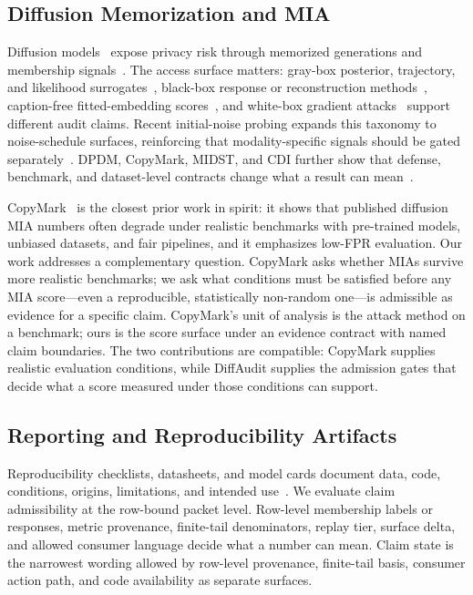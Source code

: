 \documentclass[10pt,conference]{IEEEtran}
\begin{document}
\subsection{Diffusion Memorization and MIA}

Diffusion models~\cite{ho2020ddpm,rombach2022ldm} expose privacy risk through
memorized generations and membership signals~\cite{carlini2023extracting,somepalli2023replication}.
The access surface matters: gray-box posterior, trajectory, and likelihood
surrogates~\cite{duan2023secmi,kong2024pia,zha2024clid,tracingroots2025},
black-box response or reconstruction methods~\cite{rediffuse2025,reconstruction2025blackbox},
caption-free fitted-embedding scores~\cite{jeon2026mofit}, and white-box
gradient attacks~\cite{gsa2025whitebox} support different audit claims. Recent
initial-noise probing expands this taxonomy to noise-schedule surfaces,
reinforcing that modality-specific signals should be gated separately~\cite{lian2026noiseprobe}.
DPDM, CopyMark, MIDST, and CDI further show that defense, benchmark, and
dataset-level contracts change what a result can mean~\cite{dockhorn2023private,liang2024copymark,midst2026challenge,dubinski2025cdi}.

CopyMark~\cite{liang2024copymark} is the closest prior work in spirit: it shows
that published diffusion MIA numbers often degrade under realistic benchmarks
with pre-trained models, unbiased datasets, and fair pipelines, and it emphasizes
low-FPR evaluation. Our work addresses a complementary question. CopyMark asks
whether MIAs survive more realistic benchmarks; we ask what conditions must be
satisfied before any MIA score---even a reproducible, statistically non-random
one---is admissible as evidence for a specific claim. CopyMark's unit of analysis
is the attack method on a benchmark; ours is the score surface under an evidence
contract with named claim boundaries. The two contributions are compatible:
CopyMark supplies realistic evaluation conditions, while DiffAudit supplies the
admission gates that decide what a score measured under those conditions can
support.

\subsection{Reporting and Reproducibility Artifacts}

Reproducibility checklists, datasheets, and model cards document data, code,
conditions, origins, limitations, and intended use~\cite{pineau2021reproducibility,gebru2021datasheets,mitchell2019modelcards}.
We evaluate claim admissibility at the row-bound packet level. Row-level
membership labels or responses, metric provenance, finite-tail denominators,
replay tier, surface delta, and allowed consumer language decide what a number
can mean. Claim state is the narrowest wording allowed by row-level provenance,
finite-tail basis, consumer action path, and code availability as separate
surfaces.
\end{document}
